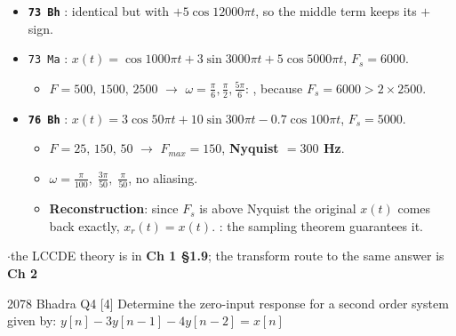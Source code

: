 {\begin{itemize}
\begin{itemize}
    \item For $0\le n\le3$: $x[n]=\{-5,\;-6.472,\;14.143,\;-6.053\}$ to 3 dp.
  \end{itemize}
  \item \textbf{\texttt{73 Bh}} : identical but with $+5\cos12000\pi t$, so the
        middle term keeps its $+$ sign.
  \item \texttt{73 Ma} : $x(t)=\cos1000\pi t+3\sin3000\pi t+5\cos5000\pi t$,
        $F_s=6000$.
  \begin{itemize}
    \item $F=500,\,1500,\,2500$ $\rightarrow$ $\omega=\frac{\pi}{6},\frac{\pi}{2},
          \frac{5\pi}{6}$: \mk{all already inside $[-\pi,\pi)$, no aliasing},
          because $F_s=6000>2\times2500$.
  \end{itemize}
  \item \textbf{\texttt{76 Bh}} :
        $x(t)=3\cos50\pi t+10\sin300\pi t-0.7\cos100\pi t$, $F_s=5000$.
  \begin{itemize}
    \item $F=25,\,150,\,50$ $\rightarrow$ $F_{max}=150$, \textbf{Nyquist $=300$ Hz}.
    \item $\omega=\frac{\pi}{100},\;\frac{3\pi}{50},\;\frac{\pi}{50}$, no aliasing.
    \item \textbf{Reconstruction}: since $F_s$ is above Nyquist the original
          $x(t)$ comes back exactly, $x_r(t)=x(t)$. : the sampling theorem guarantees it.
  \end{itemize}
\end{itemize}}

\hr

{\color{sub}\footnotesize {}  \gap$\cdot$\gap the LCCDE theory
is in \textbf{Ch 1 \S1.9}; the transform route to the same answer is \textbf{Ch 2}}

\begin{asked}{2078 Bhadra \textperiodcentered{} Q4 \textperiodcentered{} [4]}
Determine the zero-input response for a second order system given by:
$y[n]-3y[n-1]-4y[n-2]=x[n]$
\end{asked}

